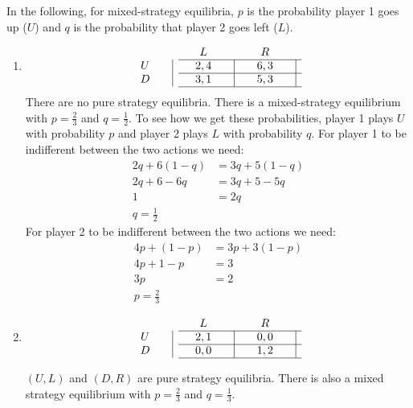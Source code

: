 \documentclass[12pt]{article}
\newcounter{question}[section]
\newenvironment{subquestions}{
  \begin{enumerate}[label=(\roman*)]}{\end{enumerate}}
\begin{document}
  \textcolor{solution-color}{
    In the following, for mixed-strategy equilibria, $p$ is the probability
  player 1 goes up ($U$) and $q$ is the probability that player 2 goes left
  ($L$).
  }
\begin{subquestions}
  \item
  \setlength{\arraycolsep}{0pt}
  \[
  \begin{array}{cccccc}
  &  & \quad L \quad & & \quad R \quad  &  \\
  \cline{3-6} U \quad & \vline{} & \quad 2,4  \quad & \vline{} & \quad 6,3 \quad & \vline{}  \\
  \cline{3-6} D \quad & \vline{} & \quad 3,1 \quad & \vline{} & \quad 5,3 \quad & \vline{} \\
  \cline{3-6}
  \end{array}
  \]
  \textcolor{solution-color}{
    There are no pure strategy equilibria. There is a mixed-strategy
    equilibrium with $p=\frac{2}{3}$ and $q=\frac{1}{2}$. To see how we get these probabilities, player 1 plays $U$ with probability $p$ and player 2 plays $L$ with probability $q$. For player 1 to be indifferent between the two actions we need:
    \begin{align*}
  2q+6\left( 1-q \right)&=3q+5\left( 1-q \right) \\
  2q + 6 - 6q &= 3q+5-5q\\
  1&=2q\\
  q=\frac{1}{2}
    \end{align*}
    For player 2 to be indifferent between the two actions we need:
    \begin{align*}
      4p+\left( 1-p \right)&=3p+3\left( 1-p \right)\\
      4p+1-p&=3\\
      3p&=2\\
      p=\frac{2}{3}
    \end{align*}
  }

  \item
  \setlength{\arraycolsep}{0pt}
  \[
  \begin{array}{cccccc}
  &  & \quad L \quad & & \quad R \quad  &  \\
  \cline{3-6} U \quad & \vline{} & \quad 2,1  \quad & \vline{} & \quad 0,0 \quad & \vline{}  \\
  \cline{3-6} D \quad & \vline{} & \quad 0,0 \quad & \vline{} & \quad 1,2 \quad & \vline{} \\
  \cline{3-6}
  \end{array}
  \]

  \textcolor{solution-color}{
    $(U,L)$ and $(D,R)$ are pure strategy equilibria. There is also a mixed
    strategy equilibrium with $p=\frac{2}{3}$ and $q=\frac{1}{3}$.
  }


\end{subquestions}
\end{document}
